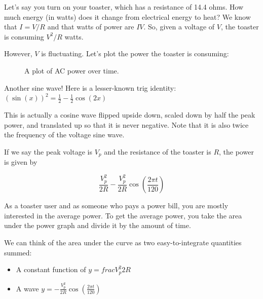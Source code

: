 Let's say you turn on your toaster, which has a resistance of 14.4
ohms. How much energy (in watts) does it change from electrical energy
to heat? We know that $I = V/R$ and that watts of power are
$IV$. So, given a voltage of $V$, the toaster is consuming $V^2/R$
watts.

However, $V$ is fluctuating. Let's plot the power the toaster is consuming:
\begin{figure}[htbp]
    \centering
    \caption{A plot of AC power over time.}
    \label{fig:acpowerGraph}
\end{figure}
Another sine wave! Here is a lesser-known trig identity: $\left( \sin(x) \right)^2 = \frac{1}{2} - \frac{1}{2}\cos(2x)$

This is actually a cosine wave flipped upside down, scaled down by
half the peak power, and translated up so that it is never
negative. Note that it is also twice the frequency of the voltage sine
wave.

If we say the peak voltage is $V_p$ and the resistance of the toaster
is $R$, the power is given by

$$\frac{V_p^2}{2R} - \frac{V_p^2}{2R} \cos \left(\frac{2\pi t}{120} \right)$$

As a toaster user and as someone who pays a power bill, you are mostly
interested in the average power.  To get the average power, you take
the area under the power graph and divide it by the amount of time.

We can think of the area under the curve as two easy-to-integrate quantities summed:
\begin{itemize}
\item A constant function of $y = frac{V_p^2}{2R}$
\item A wave $y = - \frac{V_p^2}{2R} \cos \left(\frac{2\pi t}{120} \right)$
\end{itemize}

